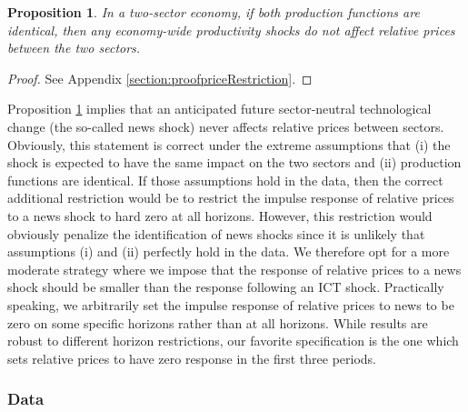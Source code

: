 \documentclass[12pt]{article}
\newtheorem{prop}{Proposition}
\begin{document}
\begin{prop}\label{prop:priceRestriction}
In a two-sector economy, if both production functions are identical, then any economy-wide productivity shocks do not affect relative prices between the two sectors.
\end{prop}
\begin{proof}
	See Appendix \ref{section:proofpriceRestriction}.
\end{proof}

Proposition \ref{prop:priceRestriction} implies that an anticipated future sector-neutral technological change (the so-called news shock) never affects relative prices between sectors. Obviously, this statement is correct under the extreme assumptions that (i) the shock is expected to have the same impact on the two sectors and (ii) production functions are identical. If those assumptions hold in the data, then the correct additional restriction would be to  restrict the impulse response of relative prices to a news shock to hard zero at all horizons. However, this restriction would obviously penalize the identification of news shocks since it is unlikely that assumptions (i) and (ii) perfectly hold in the data. We therefore opt for a more moderate strategy where we impose that the response of relative prices to a news shock should be smaller than the response following an ICT shock. Practically speaking, we arbitrarily set the impulse response of relative prices to news to be zero on some specific horizons rather than at all horizons. While results are robust to different horizon restrictions, our favorite specification is the one which sets relative prices to have zero response in the first three periods. 

\subsubsection*{Data}
\end{document}
